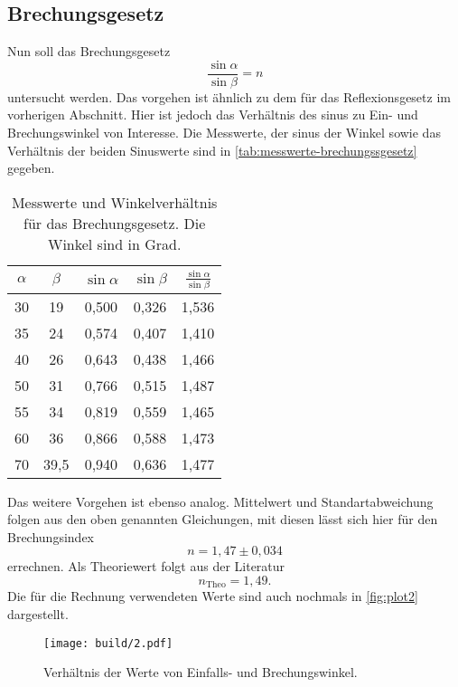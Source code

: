 \subsection{Brechungsgesetz}
\label{sec:Brechungsgesetz}
Nun soll das Brechungsgesetz
\begin{equation}
	\frac{\sin\alpha}{\sin\beta} = n
	\label{eqn:ausw:brechungsgesetz}
\end{equation}
untersucht werden. Das vorgehen ist ähnlich zu dem für das Reflexionsgesetz im vorherigen
Abschnitt. Hier ist jedoch das Verhältnis des sinus zu Ein- und Brechungswinkel von
Interesse. Die Messwerte, der sinus der Winkel sowie das Verhältnis der beiden Sinuswerte
sind in \autoref{tab:messwerte-brechungssgesetz} gegeben.
\begin{table}
	\centering
	\caption{Messwerte und Winkelverhältnis für das Brechungsgesetz. Die Winkel sind
	in Grad.}
	\label{tab:messwerte-brechungssgesetz}
	\begin{tabular}{c c c c c}
		\toprule
		$\alpha$ &
		$\beta$ &
		$\sin\alpha$ &
		$\sin\beta$ &
		$\frac{\sin\alpha}{\sin\beta}$ \\
		\midrule
		30 & 19   & 0,500 & 0,326 & 1,536	\\
		35 & 24   & 0,574 & 0,407 & 1,410	\\
		40 & 26   & 0,643 & 0,438 & 1,466	\\
		50 & 31   & 0,766 & 0,515 & 1,487	\\
		55 & 34   & 0,819 & 0,559 & 1,465	\\
		60 & 36   & 0,866 & 0,588 & 1,473	\\
		70 & 39,5 & 0,940 & 0,636 & 1,477	\\
		\bottomrule
	\end{tabular}
\end{table}
Das weitere Vorgehen ist ebenso analog. Mittelwert und Standartabweichung folgen aus den
oben genannten Gleichungen, mit diesen lässt sich hier
für den Brechungsindex
\begin{equation}
	n = 1,47 \pm 0,034
	\label{eqn:brechung-exp}
\end{equation}
errechnen. Als Theoriewert folgt aus der Literatur \cite{cosmos-indirekt}
\begin{equation}
	n_\text{Theo} = 1,49.
	\label{eqn:brechung-theo}
\end{equation}
Die für die Rechnung verwendeten Werte sind auch nochmals in \autoref{fig:plot2} dargestellt.
\begin{figure}[H]
	\centering
	\texttt{[image: build/2.pdf]}
	\caption{Verhältnis der  Werte von Einfalls- und Brechungswinkel.}
	\label{fig:plot2}
\end{figure}

